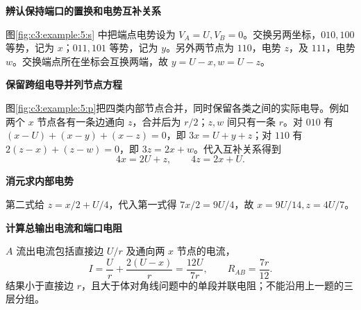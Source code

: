 \begin{solution}\textbf{辨认保持端口的置换和电势互补关系}\par\nobreak
图\ref{fig:c3:example:5:s} 中把端点电势设为 $V_A=U,V_B=0$。交换另两坐标，$010,100$ 等势，记为 $x$；$011,101$ 等势，记为 $y$。另外两节点为 $110$，电势 $z$，及 $111$，电势 $w$。交换端点所在坐标会互换两端，故 $y=U-x,w=U-z$。



\par\medskip{}\noindent\textbf{保留跨组电导并列节点方程}\par\nobreak
图\ref{fig:c3:example:5:p}把四类内部节点合并，同时保留各类之间的实际电导。例如两个 $x$ 节点各有一条边通向 $z$，合并后为 $r/2$；$z,w$ 间只有一条 $r$。对 $010$ 有 $(x-U)+(x-y)+(x-z)=0$，即 $3x=U+y+z$；对 $110$ 有 $2(z-x)+(z-w)=0$，即 $3z=2x+w$。代入互补关系得到
\[
 4x=2U+z,\qquad 4z=2x+U.
\]


\par\medskip{}\noindent\textbf{消元求内部电势}\par\nobreak
第二式给 $z=x/2+U/4$，代入第一式得 $7x/2=9U/4$，故 $x=9U/14,z=4U/7$。

\par\medskip{}\noindent\textbf{计算总输出电流和端口电阻}\par\nobreak
$A$ 流出电流包括直接边 $U/r$ 及通向两 $x$ 节点的电流，
\[
 I=\frac Ur+\frac{2(U-x)}r=\frac{12U}{7r},\qquad R_{AB}=\frac{7r}{12}.
\]
结果小于直接边 $r$，且大于体对角线问题中的单段并联电阻；不能沿用上一题的三层分组。\end{solution}
